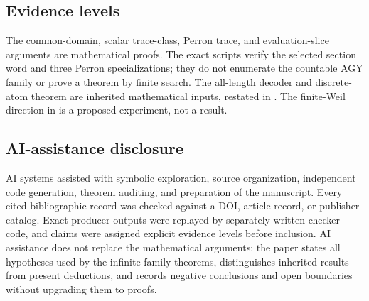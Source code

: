 \subsection{Evidence levels}

The common-domain, scalar trace-class, Perron trace, and evaluation-slice
arguments are mathematical proofs.  The exact scripts verify the selected
section word and three Perron specializations; they do not enumerate the countable
AGY family or prove a theorem by finite search.  The all-length decoder and
discrete-atom theorem are inherited mathematical inputs, restated in
.  The finite-Weil direction in
 is a proposed experiment, not a result.

\subsection{AI-assistance disclosure}

AI systems assisted with symbolic exploration, source organization,
independent code generation, theorem auditing, and preparation of the
manuscript.  Every cited bibliographic record was checked against a DOI,
article record, or publisher catalog.  Exact producer outputs were replayed
by separately written checker code, and claims were assigned explicit
evidence levels before inclusion.  AI assistance does not replace the
mathematical arguments: the paper states all hypotheses used by the
infinite-family theorems, distinguishes inherited results from present
deductions, and records negative conclusions and open boundaries without
upgrading them to proofs.
